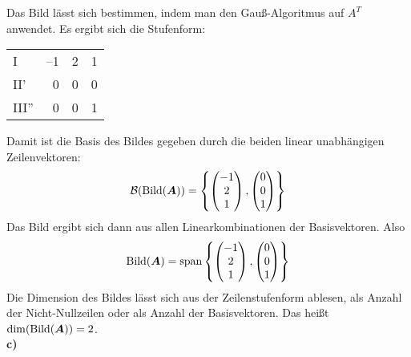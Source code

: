 {    Das Bild lässt sich bestimmen, indem man den Gauß-Algoritmus auf $A^T$ anwendet. Es ergibt sich die Stufenform:
            \begin{center}
            \begin{tabular}{|l|rrc|} \hline
                I    & 	--1 & 2  & 1   \\ 
	 			II'  & 	0   & 0  & 0   \\ 
	 			III''&	0   & 0  & 1 \\ \hline
			\end{tabular}
		\end{center}
    Damit ist die Basis des Bildes gegeben durch die beiden linear unabh\"angigen Zeilenvektoren:
    $$
    \mathcal B (\mathrm{Bild} (\boldsymbol A)) = \left\{ \begin{pmatrix} -1\\2\\1 \end{pmatrix} ,\begin{pmatrix} 0\\0\\1 \end{pmatrix} \right\}
    $$
    Das Bild ergibt sich dann aus allen Linearkombinationen der Basisvektoren. Also
    $$
    \mathrm{Bild} (\boldsymbol A) = \mathrm{span} \left\{ \begin{pmatrix} -1\\2\\1 \end{pmatrix} ,\begin{pmatrix} 0\\0\\1 \end{pmatrix} \right\}
    $$
    Die Dimension des Bildes lässt sich aus der Zeilenstufenform ablesen, als Anzahl der Nicht-Nullzeilen oder als 
    Anzahl der Basisvektoren. Das heißt $\dim(\mathrm{Bild} (\boldsymbol A)) = 2$.\\
    
    \textbf{c)} %
    
}
